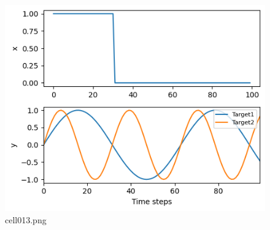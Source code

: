 \begin{figure}[ht]
	\centering
	\includegraphics[scale=0.8, max width=\linewidth]{./fig/solve-credit-assignment-problem/bptt/cell013.png}
	\caption{cell013.png}
	\label{cell013.png}
\end{figure}